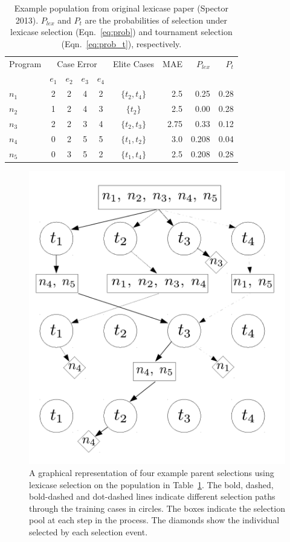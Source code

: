 \documentclass[twoside]{article}
\begin{document}
\begin{table}
\centering
\caption{Example population from original lexicase paper (Spector 2013). $P_{lex}$ and $P_t$ are the probabilities of selection under lexicase selection (Eqn.~\ref{eq:prob}) and tournament selection (Eqn.~\ref{eq:prob_t}), respectively.}\label{tbl:ex}
\begin{tabular}{l|cccc|c|r|rr}\toprule
Program & \multicolumn{4}{c}{Case Error} & Elite Cases & MAE & $P_{lex}$ & $P_{t}$\\
& $e_1$ & $e_2$ & $e_3$ & $e_4$ & \\ \midrule
$n_1$ & 2 & 2 & 4 & 2 & $\{t_2,t_4\}$ &	2.5		&	0.25 	& 	0.28	\\
$n_2$ & 1 & 2 & 4 & 3 & $\{t_2\}$		&	2.5		&	0.00	&	0.28	\\
$n_3$ & 2 & 2 & 3 & 4 & $\{t_2,t_3\}$ &	2.75	& 	0.33	&	0.12	\\
$n_4$ & 0 & 2 & 5 & 5 & $\{t_1,t_2\}$ &	3.0		& 	0.208	&	0.04	\\
$n_5$ & 0 & 3 & 5 & 2 & $\{t_1,t_4\}$ &	2.5		&	0.208	&	0.28	\\ \bottomrule
\end{tabular}
\end{table}


\begin{figure}[htb]
\centering
  \includegraphics[height = 0.3\textheight]{figs/lex_graph.pdf}
  \caption{A graphical representation of four example parent selections using lexicase selection on the population in Table~\ref{tbl:ex}. The bold, dashed, bold-dashed and dot-dashed lines indicate different selection paths through the training cases in circles. The boxes indicate the selection pool at each step in the process. The diamonds show the individual selected by each selection event.}\label{fig:lex_graph}
\end{figure}
\end{document}

